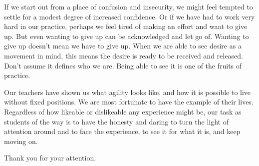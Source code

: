If we start out from a place of confusion and insecurity, we might feel
tempted to settle for a modest degree of increased confidence. Or if we
have had to work very hard in our practice, perhaps we feel tired of
making an effort and want to give up. But even wanting to give up can be
acknowledged and let go of. Wanting to give up doesn’t mean we have to
give up. When we are able to see desire as a movement in mind, this
means the desire is ready to be received and released. Don’t assume it
defines who we are. Being able to see it is one of the fruits of
practice.

Our teachers have shown us what agility looks like, and how it is
possible to live without fixed positions. We are most fortunate to have
the example of their lives. Regardless of how likeable or dislikeable
any experience might be, our task as students of the way is to have the
honesty and daring to turn the light of attention around and to face the
experience, to see it for what it is, and keep moving on.

Thank you for your attention.

